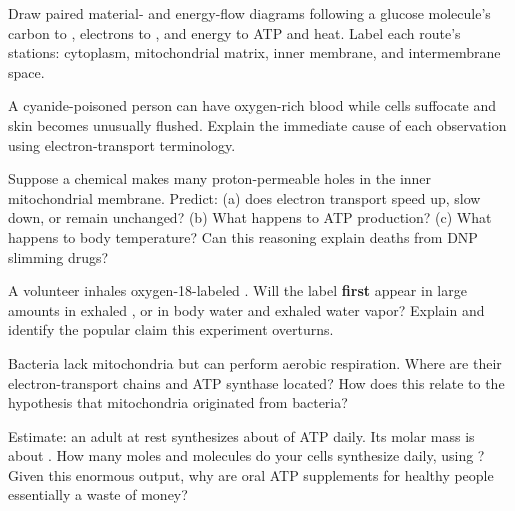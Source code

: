 \begin{sikaoti}
\item Draw paired material- and energy-flow diagrams following a glucose molecule's carbon to , electrons to , and energy to ATP and heat. Label each route's stations: cytoplasm, mitochondrial matrix, inner membrane, and intermembrane space.
\item A cyanide-poisoned person can have oxygen-rich blood while cells suffocate and skin becomes unusually flushed. Explain the immediate cause of each observation using electron-transport terminology.
\item Suppose a chemical makes many proton-permeable holes in the inner mitochondrial membrane. Predict: (a) does electron transport speed up, slow down, or remain unchanged? (b) What happens to ATP production? (c) What happens to body temperature? Can this reasoning explain deaths from DNP slimming drugs?
\item A volunteer inhales oxygen-18-labeled . Will the label \textbf{first} appear in large amounts in exhaled , or in body water and exhaled water vapor? Explain and identify the popular claim this experiment overturns.
\item Bacteria lack mitochondria but can perform aerobic respiration. Where are their electron-transport chains and ATP synthase located? How does this relate to the hypothesis that mitochondria originated from bacteria?
\item Estimate: an adult at rest synthesizes about  of ATP daily. Its molar mass is about . How many moles and molecules do your cells synthesize daily, using ? Given this enormous output, why are oral ATP supplements for healthy people essentially a waste of money?
\end{sikaoti}
